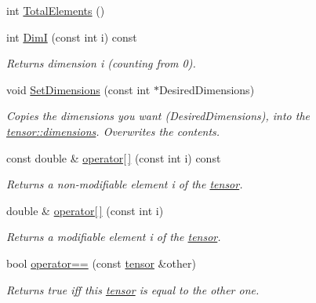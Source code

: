 \begin{DoxyCompactItemize}
int \hyperlink{classJKBuilder_1_1tensor_a537b2f14296e2f0e62f00e1703c5fa08}{TotalElements} ()
\item 
int \hyperlink{classJKBuilder_1_1tensor_a6bdcfca6493bc217b607317dbceb28b2}{DimI} (const int i) const 
\begin{DoxyCompactList}\small\item\em Returns dimension i (counting from 0). \item\end{DoxyCompactList}\item 
void \hyperlink{classJKBuilder_1_1tensor_ace6bcf62c74395ab9e37abc4935f66e0}{SetDimensions} (const int $\ast$DesiredDimensions)
\begin{DoxyCompactList}\small\item\em Copies the dimensions you want (DesiredDimensions), into the \hyperlink{classJKBuilder_1_1tensor_a2ce1e6e0782ddee097f2c4aa2663d3e9}{tensor::dimensions}. Overwrites the contents. \item\end{DoxyCompactList}\item 
const double \& \hyperlink{classJKBuilder_1_1tensor_a4f0dc1b84b580cec49500c70f87e084a}{operator\mbox{[}$\,$\mbox{]}} (const int i) const 
\begin{DoxyCompactList}\small\item\em Returns a non-\/modifiable element i of the \hyperlink{classJKBuilder_1_1tensor}{tensor}. \item\end{DoxyCompactList}\item 
double \& \hyperlink{classJKBuilder_1_1tensor_a38c9fed6b117f7cf8b76785648d76b62}{operator\mbox{[}$\,$\mbox{]}} (const int i)
\begin{DoxyCompactList}\small\item\em Returns a modifiable element i of the \hyperlink{classJKBuilder_1_1tensor}{tensor}. \item\end{DoxyCompactList}\item 
bool \hyperlink{classJKBuilder_1_1tensor_a10ae0b61e655854d12c6465d2b9e3506}{operator==} (const \hyperlink{classJKBuilder_1_1tensor}{tensor} \&other)
\begin{DoxyCompactList}\small\item\em Returns true iff this \hyperlink{classJKBuilder_1_1tensor}{tensor} is equal to the other one. \item\end{DoxyCompactList}\item 

\end{DoxyCompactItemize}
